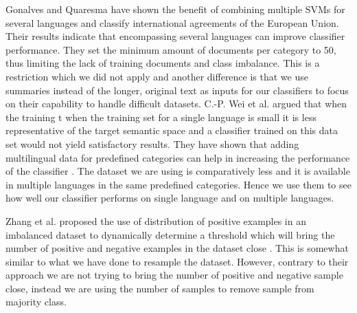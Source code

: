 Gonalves and Quaresma \cite{gonalves2010} have shown the benefit of combining multiple SVMs for several languages and classify international agreements of the European Union. Their results indicate that encompassing several languages can improve classifier performance. They set the minimum amount of documents per category to 50, thus limiting the lack of training documents and class imbalance. This is a restriction which we did not apply and another difference is that we use summaries instead of the longer, original text as inputs for our classifiers to focus on their capability to handle difficult datasets. C.-P. Wei et al. argued that when the training t when the training set for a single language is small it is less representative of the target semantic space and a classifier trained on this data set would not yield satisfactory results. They have shown that adding multilingual data for  predefined categories can help in increasing the performance of the classifier \cite{Wei:2014:EPD:2566999.2567111}. The dataset we are using is comparatively less and it is available in multiple languages in the same predefined categories. Hence we use them to see how well our classifier performs on single language and on multiple languages.

Zhang et al. proposed the use of distribution of positive examples in an imbalanced dataset to dynamically determine a threshold which will bring the number of positive and negative examples in the dataset close \cite{Zhang2013ImbalancedMN}. This is somewhat similar to what we have done to resample the dataset. However, contrary to their approach we are not trying to bring the number of positive and negative sample close, instead we are using the number of samples to remove sample from majority class. 
